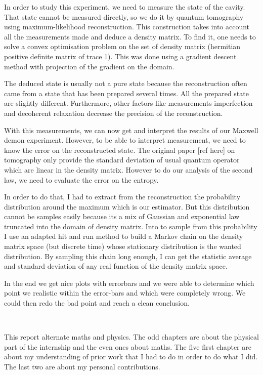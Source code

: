 \documentclass[10pt]{report}
\begin{document}
In order to study this experiment, we need to measure the state of the cavity.
That state cannot be measured directly, so we do it by quantum tomography using
maximum-likelihood reconstruction. This construction takes into account all the
measurements made and deduce a density matrix. To find it, one needs to solve a
convex optimisation problem on the set of density matrix (hermitian positive
definite matrix of trace 1). This was done using a gradient descent method with
projection of the gradient on the domain.

The deduced state is usually not a pure state because the reconstruction often
came from a state that has been prepared several times.
All the prepared state are slightly different.
Furthermore, other factors like measurements imperfection and decoherent
relaxation decrease the precision of the reconstruction.

With this measurements, we can now get and interpret the results of our Maxwell
demon experiment. However, to be able to interpret measurement, we need to know
the error on the reconstructed state. The original paper [ref here] on
tomography only provide the standard deviation of usual quantum operator which
are linear in the density matrix. However to do our analysis of the second law,
we need to evaluate the error on the entropy.

In order to do that, I had to extract from the reconstruction the probability
distribution around the maximum which is our estimator. But this distribution
cannot be samples easily because its a mix of Gaussian and exponential law
truncated into the domain of density matrix. Into to sample from this
probability I use an adapted hit and run method to build a Markov chain on the
density matrix space (but discrete time) whose stationary distribution is the
wanted distribution. By sampling this chain long enough, I can get the statistic
average and standard deviation of any real function of the density matrix space.

In the end we get nice plots with errorbars and we were able to determine which
point we realistic within the error-bars and which were completely wrong. We
could then redo the bad point and reach a clean conclusion.

\

This report alternate maths and physics. The odd chapters are about the physical
part of the internship and the even ones about maths. The five first chapter are
about my understanding of prior work that I had to do in order to do what I did.
The last two are about my personal contributions.
\end{document}
